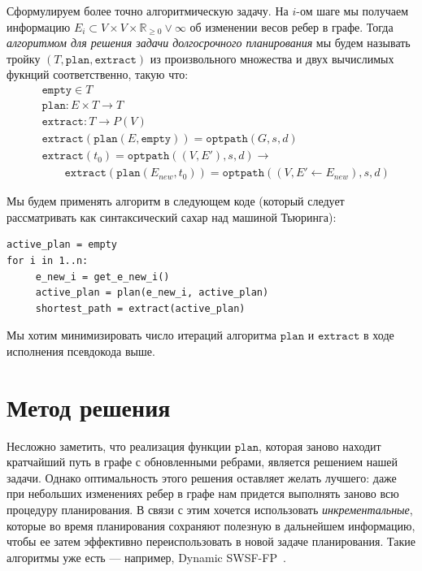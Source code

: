 \documentclass[11pt]{article}
\newcommand{\realpositive}{\mathbb{R}_{\geqslant 0}}
\begin{document}
    \pagebreak
    \newcommand{\fplan}{\mathtt{plan}}
    \newcommand{\fextract}{\mathtt{extract}}
    \newcommand{\fempty}{\mathtt{empty}}
    Сформулируем более точно алгоритмическую задачу.
    На $i$-ом шаге мы получаем информацию $E_i \subset V \times V \times \realpositive \lor \infty$ об изменении весов ребер в графе.
    Тогда \textit{алгоритмом для решения задачи долгосрочного планирования} мы будем называть тройку $(T, \fplan, \fextract)$ из произвольного множества и двух вычислимых фукнций соответственно, такую что:
    \begin{align*}
        &\fempty \in T \\
        &\fplan: E \times T \rightarrow T \\
        &\fextract: T \rightarrow P(V) \\
        &\fextract(\fplan(E, \fempty)) = \mathtt{optpath}(G, s, d) \\
        &\fextract(t_0) = \mathtt{optpath}((V, E'), s, d) \rightarrow \\
        &\qquad \fextract(\fplan(E_{new}, t_0)) = \mathtt{optpath}((V, E' \leftarrow E_{new}), s, d)
    \end{align*}

    Мы будем применять алгоритм в следующем коде (который следует рассматривать как синтаксический сахар над машиной Тьюринга):
    \begin{verbatim}
active_plan = empty
for i in 1..n:
     e_new_i = get_e_new_i()
     active_plan = plan(e_new_i, active_plan)
     shortest_path = extract(active_plan)
    \end{verbatim}
    Мы хотим минимизировать число итераций алгоритма $\fplan$ и $\fextract$ в ходе исполнения псевдокода выше.


    \section{Метод решения}

    Несложно заметить, что реализация функции \(\fplan\), которая заново находит кратчайший путь в графе с обновленными ребрами, является решением нашей задачи.
    Однако оптимальность этого решения оставляет желать лучшего: даже при небольших изменениях ребер в графе нам придется выполнять заново всю процедуру планирования.
    В связи с этим хочется использовать \textit{инкрементальные}, которые во время планирования сохраняют полезную в дальнейшем информацию, чтобы ее затем эффективно переиспользовать в новой задаче планирования.
    Такие алгоритмы уже есть --- например, Dynamic SWSF-FP~\cite{RAMALINGAM1996267}.
\end{document}
